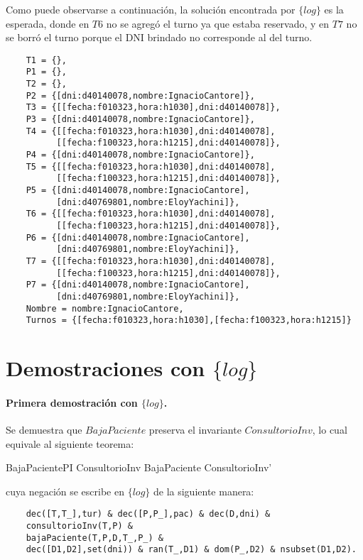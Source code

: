 \documentclass[12pt]{article}
\newcommand{\setlog}{$\{log\}$\xspace}
\begin{document}
Como puede observarse a continuación, la solución encontrada por \setlog es la esperada, donde en $T6$ no se agregó el turno ya que estaba reservado, y en $T7$ no se borró el turno porque el DNI brindado no corresponde al del turno.

\begin{verbatim}
    T1 = {},
    P1 = {},
    T2 = {},
    P2 = {[dni:d40140078,nombre:IgnacioCantore]},
    T3 = {[[fecha:f010323,hora:h1030],dni:d40140078]},
    P3 = {[dni:d40140078,nombre:IgnacioCantore]},
    T4 = {[[fecha:f010323,hora:h1030],dni:d40140078],
          [[fecha:f100323,hora:h1215],dni:d40140078]},
    P4 = {[dni:d40140078,nombre:IgnacioCantore]},
    T5 = {[[fecha:f010323,hora:h1030],dni:d40140078],
          [[fecha:f100323,hora:h1215],dni:d40140078]},
    P5 = {[dni:d40140078,nombre:IgnacioCantore],
          [dni:d40769801,nombre:EloyYachini]},
    T6 = {[[fecha:f010323,hora:h1030],dni:d40140078],
          [[fecha:f100323,hora:h1215],dni:d40140078]},
    P6 = {[dni:d40140078,nombre:IgnacioCantore],
          [dni:d40769801,nombre:EloyYachini]},
    T7 = {[[fecha:f010323,hora:h1030],dni:d40140078],
          [[fecha:f100323,hora:h1215],dni:d40140078]},
    P7 = {[dni:d40140078,nombre:IgnacioCantore],
          [dni:d40769801,nombre:EloyYachini]},
    Nombre = nombre:IgnacioCantore,
    Turnos = {[fecha:f010323,hora:h1030],[fecha:f100323,hora:h1215]}
\end{verbatim}

\section*{Demostraciones con \setlog}

\paragraph{Primera demostración con \setlog.}

Se demuestra que $BajaPaciente$ preserva el invariante $ConsultorioInv$, lo cual equivale al siguiente teorema:

\begin{theorem}{BajaPacientePI}
    ConsultorioInv \land BajaPaciente \implies ConsultorioInv'
\end{theorem}

cuya negación se escribe en \setlog de la siguiente manera:

\begin{verbatim}
    dec([T,T_],tur) & dec([P,P_],pac) & dec(D,dni) &
    consultorioInv(T,P) &
    bajaPaciente(T,P,D,T_,P_) &
    dec([D1,D2],set(dni)) & ran(T_,D1) & dom(P_,D2) & nsubset(D1,D2).
\end{verbatim}
\end{document}
